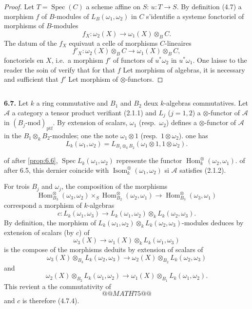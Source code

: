 \documentclass[12pt,a4paper]{article}
\theoremstyle{plain}
\theoremstyle{definition}
\theoremstyle{remark}
\DeclareMathOperator{\Hom}{Hom}
\DeclareMathOperator{\Isom}{Isom}
\DeclareMathOperator{\Spec}{Spec}
\begin{document}
\begin{proof}
Let $T = \Spec(C)$ a scheme affine on $S$: $u : T \to S$. By definition (4.7) a morphism $f$ of $B$-modules of $L_B(\omega_1,\omega_2)$ in $C$ s'identifie a systeme fonctoriel of morphisms of $B$-modules
\[
f_X : \omega_2(X) \to \omega_1(X) \otimes_B C.
\]
The datum of the $f_X$ equivaut a celle of morphisms $C$-lineaires
\[
f'_X : \omega_2(X) \otimes_B C \to \omega_1(X) \otimes_B C,
\]
fonctoriels en $X$, i.e.~a morphism $f'$ of functors of $u^*\omega_2$ in $u^*\omega_1$. One laisse to the reader the soin of verify that for that $f$ Let morphism of algebras, it is necessary and sufficient that $f'$ Let morphism of $\otimes$-functors.
\end{proof}

\subsection{}

\textbf{6.7.} Let $k$ a ring commutative and $B_1$ and $B_2$ deux $k$-algebras commutatives. Let $\mathcal{A}$ a category a tensor product verifiant (2.1.1) and $L_j$ ($j = 1,2$) a $\otimes$-functor of $\mathcal{A}$ in $(B_j\text{-mod})_\mathrm{ptf}$. By extension of scalars, $\omega_1$ (resp.~$\omega_2$) defines a $\otimes$-functor of $\mathcal{A}$ in the $B_1 \otimes_k B_2$-modules; one the note $\omega_1 \otimes 1$ (resp.~$1 \otimes \omega_2$). one has
\[
L_k(\omega_1, \omega_2) = L_{B_1 \otimes_k B_2}(\omega_1 \otimes 1, 1 \otimes \omega_2).
\]

of after \ref{prop:6.6}, $\Spec L_k(\omega_1,\omega_2)$ represente the functor $\Hom^\otimes_k(\omega_2,\omega_1)$. of after 6.5, this dernier coincide with $\Isom^\otimes_k(\omega_1,\omega_2)$ si $\mathcal{A}$ satisfies (2.1.2).

For trois $B_j$ and $\omega_j$, the composition of the morphisms
\[
\Hom^\otimes_{B_3}(\omega_3,\omega_2) \times_S \Hom^\otimes_{B_2}(\omega_2,\omega_1) \to \Hom^\otimes_{B_3}(\omega_3,\omega_1)
\]
correspond a morphism of $k$-algebras
\[
c : L_k(\omega_1,\omega_3) \to L_k(\omega_1,\omega_2) \otimes_k L_k(\omega_2,\omega_3).
\]
By definition, the morphism of $L_k(\omega_1,\omega_2) \otimes_k L_k(\omega_2,\omega_3)$-modules deduces by extension of scalars (by $c$) of
\[
\omega_3(X) \to \omega_1(X) \otimes_k L_k(\omega_1,\omega_3)
\]
is the compose of the morphisms deduits by extension of scalars of
\[
\omega_3(X) \otimes_{B_3} L_k(\omega_2,\omega_3) \to \omega_2(X) \otimes_{B_2} L_k(\omega_2,\omega_3)
\]
and
\[
\omega_2(X) \otimes_{B_2} L_k(\omega_1,\omega_2) \to \omega_1(X) \otimes_{B_1} L_k(\omega_1,\omega_2).
\]
This revient a the commutativity of
\[
@@MATH75@@
\]
and $c$ is therefore (4.7.4).
\end{document}
